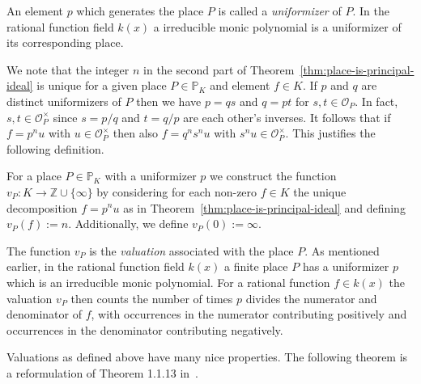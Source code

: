 An element \(p\) which generates the place \(P\) is called a \textit{uniformizer} of \(P\). In the rational function field \(k(x)\) a irreducible monic polynomial is a uniformizer of its corresponding place.

We note that the integer \(n\) in the second part of Theorem~\ref{thm:place-is-principal-ideal} is unique for a given place \(P \in \mathbb{P}_{K}\) and element \(f \in K\). If \(p\) and \(q\) are distinct uniformizers of \(P\) then we have \(p = qs\) and \(q = pt\) for \(s,t \in \mathcal{O}_{P}\). In fact, \(s,t \in \mathcal{O}_{P}^{\times}\) since \(s = p/q\) and \(t = q/p\) are each other's inverses. It follows that if \(f = p^{n}u\) with \(u \in \mathcal{O}_{P}^{\times}\) then also \(f = q^{n}s^{n}u\) with \(s^{n}u \in \mathcal{O}_{P}^{\times}\). This justifies the following definition.

\begin{definition}%
  \label{def:valuation}
  For a place \(P \in \mathbb{P}_{K}\) with a uniformizer \(p\) we construct the function \(v_{P} : K \to \mathbb{Z} \cup \{\infty\}\) by considering for each non-zero \(f \in K\) the unique decomposition \(f = p^{n}u\) as in Theorem~\ref{thm:place-is-principal-ideal} and defining \(v_{P}(f) := n\). Additionally, we define \({v_{P}(0) := \infty}\).
\end{definition}

The function \(v_{P}\) is the \textit{valuation} associated with the place \(P\). As mentioned earlier, in the rational function field \(k(x)\) a finite place \(P\) has a uniformizer \(p\) which is an irreducible monic polynomial. For a rational function \(f \in k(x)\) the valuation \(v_{P}\) then counts the number of times \(p\) divides the numerator and denominator of \(f\), with occurrences in the numerator contributing positively and occurrences in the denominator contributing negatively.

Valuations as defined above have many nice properties. The following theorem is a reformulation of Theorem 1.1.13 in~\cite{stichtenoth-2009-algebraic-function-fields}.

